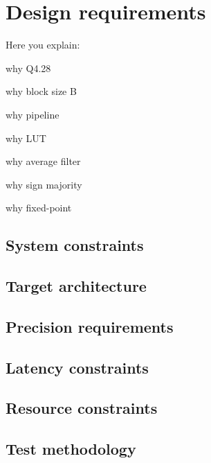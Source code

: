 \chapter{Design requirements}
Here you explain:

why Q4.28

why block size B

why pipeline

why LUT

why average filter



why sign majority

why fixed-point
\section{System constraints}
\section{Target architecture}
\section{Precision requirements}
\section{Latency constraints}
\section{Resource constraints}
\section{Test methodology}


